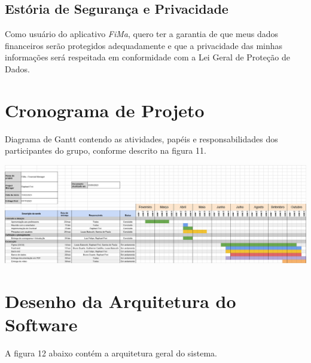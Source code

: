 \subsection{Estória de Segurança e Privacidade}
Como usuário do aplicativo \textit{FiMa}, quero ter a garantia de que meus dados financeiros serão protegidos adequadamente e que a privacidade das minhas informações será respeitada em conformidade com a Lei Geral de Proteção de Dados.

\section{Cronograma de Projeto}

Diagrama de Gantt contendo as atividades, papéis e responsabilidades dos participantes do grupo, conforme descrito na figura 11.

    \vspace{\baselineskip}
    \begin{center}
        \begin{minipage}{\textwidth}
            \includegraphics[scale=0.4]{figs/gantt.png}
            \label{fig:gantt}
        \end{minipage}
    \end{center}
    

\section{Desenho da Arquitetura do Software}

A figura 12 abaixo contém a arquitetura geral do sistema.

